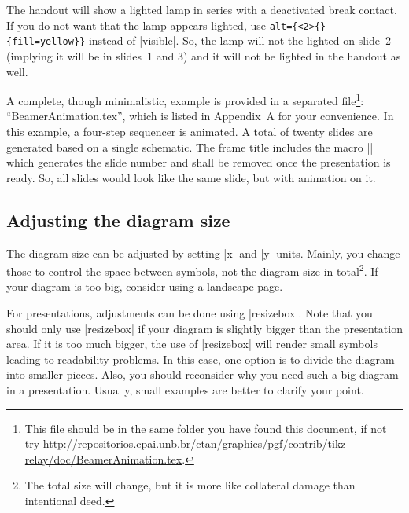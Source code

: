 \documentclass[a4paper]{ltxdoc}
\begin{document}
\begin{codeexample}
\end{codeexample}
\noindent{}The handout will show a lighted lamp in series with a deactivated break contact. If you do not want that the lamp appears lighted, use \verb|alt={<2>{}{fill=yellow}}| instead of |visible|. So, the lamp will not the lighted on slide~2 (implying it will be in slides~1 and 3) and it will not be lighted in the handout as well.

A complete, though minimalistic, example is provided in a separated file\footnote{This file should be in the same folder you have found this document, if not try \url{http://repositorios.cpai.unb.br/ctan/graphics/pgf/contrib/tikz-relay/doc/BeamerAnimation.tex}.}: ``BeamerAnimation.tex'', which is listed in Appendix~A for your convenience. In this example, a four-step sequencer is animated. A total of twenty slides are generated based on a single schematic. The frame title includes the macro |\overlaynumber| which generates the slide number and shall be removed once the presentation is ready. So, all slides would look like the same slide, but with animation on it.


\subsection{Adjusting the diagram size}

The diagram size can be adjusted by setting |x| and |y| units. Mainly, you change those to control the space between symbols, not the diagram size in total\footnote{The total size will change, but it is more like collateral damage than intentional deed.}. If your diagram is too big, consider using a landscape page.

For presentations, adjustments can be done using |resizebox|. Note that you should only use |resizebox| if your diagram is slightly bigger than the presentation area. If it is too much bigger, the use of |resizebox| will render small symbols leading to readability problems. In this case, one option is to divide the diagram into smaller pieces. Also, you should reconsider why you need such a big diagram in a presentation. Usually, small examples are better to clarify your point.
\end{document}
